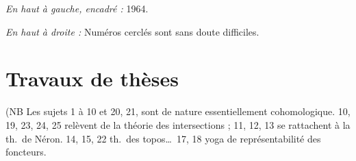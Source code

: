 \documentclass[11pt,a4paper]{article}
\begin{document}

\emph{En haut à gauche, encadré :} 1964.

\emph{En haut à droite :} Numéros cerclés sont sans doute difficiles.

\section*{Travaux de thèses}


(NB Les sujets 1 à 10 et 20, 21,  sont de nature essentiellement
cohomologique. 10, 19, 23, 24, 25 relèvent de la théorie des intersections ;
11, 12, 13 se rattachent à la th.\ de Néron. 14, 15, 22 th.\ des topos…\
17, 18 yoga de représentabilité des foncteurs.

\end{document}
